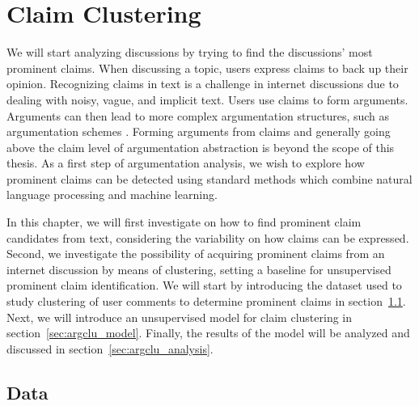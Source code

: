 \chapter{Claim Clustering}
\label{chap:argclu}


We will start analyzing discussions by trying to find the discussions' most
prominent claims.
When discussing a topic, users express claims to back up their opinion. 
Recognizing claims in text is a challenge in internet discussions due to 
dealing with noisy, vague, and implicit text. 
Users use claims to form arguments. 
Arguments can then lead to more complex 
argumentation structures, such as argumentation schemes \citep{walton2008argumentation}. 
Forming arguments from claims and generally going above the claim level of
argumentation abstraction is beyond the scope of this thesis. 
As a first step of argumentation analysis, we wish to explore how prominent
claims can be detected using standard methods which combine natural language
processing and machine learning. 

In this chapter, we will first investigate on how to find 
prominent claim candidates from text, considering the variability on how 
claims can be expressed. Second, we investigate the possibility of 
acquiring prominent claims from an internet discussion by means of clustering, 
setting a baseline for unsupervised prominent claim identification. 
We will start by introducing the dataset used to study clustering of
user comments to determine prominent claims in section~\ref{sec:argclu_data}.
Next, we will introduce an unsupervised
model for claim clustering in section~\ref{sec:argclu_model}.
Finally, the results of the model will be analyzed and discussed 
in section~\ref{sec:argclu_analysis}.

\section{Data}
\label{sec:argclu_data}


